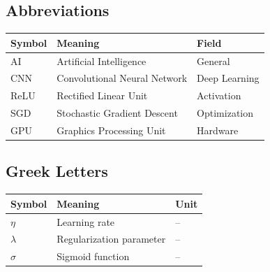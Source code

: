 
	\clearpage\pagestyle{tocstyle}
	\CustomNomenclature
	
	\subsection*{Abbreviations}
	
	\begin{tabular}{lll}
		\toprule
		Symbol & Meaning & Field \\
		\midrule
		AI      & Artificial Intelligence          & General \\
		CNN     & Convolutional Neural Network     & Deep Learning \\
		ReLU    & Rectified Linear Unit            & Activation \\
		SGD     & Stochastic Gradient Descent      & Optimization \\
		GPU     & Graphics Processing Unit         & Hardware \\
		\bottomrule
	\end{tabular}
	
	\vspace{1cm}
	\subsection*{Greek Letters}
	
	\begin{tabular}{lll}
		\toprule
		Symbol & Meaning & Unit \\
		\midrule
		$\eta$    & Learning rate             & -- \\
		$\lambda$ & Regularization parameter  & -- \\
		$\sigma$  & Sigmoid function          & -- \\
		\bottomrule
	\end{tabular}
	

